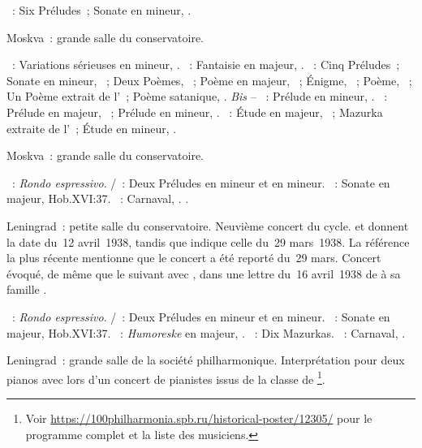 \begin{description}
 \textsc{\Scriabine{}}~: Six Préludes~; Sonate en \kF \Sharp mineur,
 .
 \item[\DateWithWeekDay{1938-04-01}]
 Moskva~: grande salle du conservatoire.

 \textsc{\Mendelssohn{}}~: Variations sérieuses en \kD mineur, .
 \textsc{\Schumann{}}~: Fantaisie en \kC majeur, .
 \textsc{\Scriabine{}}~: Cinq Préludes~; Sonate en \kF \Sharp mineur,
 ~; Deux Poèmes, ~; Poème en \kC majeur, 
 ~; Énigme,  ~; Poème,  ~;
 Un Poème extrait de l'~; Poème satanique, .
 \emph{Bis} -- \textsc{\Scriabine{}}~: Prélude en \kG mineur, 
 .
 \textsc{\Rachmaninov{}}~: Prélude en \kG majeur,  ~;
 Prélude en \kG \Sharp mineur,  .
 \textsc{\Scriabine{}}~: Étude en \kD \Flat majeur,  ~;
 Mazurka extraite de l'~; Étude en \kD \Sharp mineur, 
 .
 \item[\DateWithWeekDay{1938-04-03}]
 Moskva~: grande salle du conservatoire.

 \textsc{\CBach{}}~: \emph{Rondo espressivo}.
 \textsc{\JBach{}/\Ziloti{}}~: Deux Préludes en \kE mineur et en \kB mineur.
 \textsc{\Haydn{}}~: Sonate en \kD majeur, Hob.XVI:37.
 \textsc{\Schumann{}}~: Carnaval, .
 \textsc{\Scriabine{}}.
 \item[\DateWithWeekDay{1938-04-12}]
 Leningrad~: petite salle du conservatoire.
 Neuvième concert du cycle.
 \citet[p.~158]{Nekrasova08} et \citet[p.~412]{Scriabine} donnent la date
 du~12 avril~1938, tandis que \citet[p.~49]{White} indique celle du~29
 mars~1938.
 La référence la plus récente mentionne que le concert a été reporté du~29
 mars.
 Concert évoqué, de même que le suivant avec \DChostakovitch{}, dans une
 lettre du~16 avril~1938 de \VSofronitsky{} à sa famille
 \citep[p.~23]{Kogan08}.

 \textsc{\CBach{}}~: \emph{Rondo espressivo}.
 \textsc{\JBach{}/\Ziloti{}}~: Deux Préludes en \kE mineur et en \kB mineur.
 \textsc{\Haydn{}}~: Sonate en \kD majeur, Hob.XVI:37.
 \textsc{\Schumann{}}~: \emph{Humoreske} en \kB \Flat majeur, .
 \textsc{\Chopin{}}~: Dix Mazurkas.
 \textsc{\Schumann{}}~: Carnaval, .
 \item[\DateWithWeekDay{1938-04-15}]
 Leningrad~: grande salle de la société philharmonique.
 Interprétation pour deux pianos avec \DChostakovitch{} lors d'un concert de
 pianistes issus de la classe de \LNikolaiev{}%
 \footnote{Voir
 \href{https://100philharmonia.spb.ru/historical-poster/12305/}%
 {https://100philharmonia.spb.ru/historical-poster/12305/} pour le programme
 complet et la liste des musiciens.}.


\end{description}
